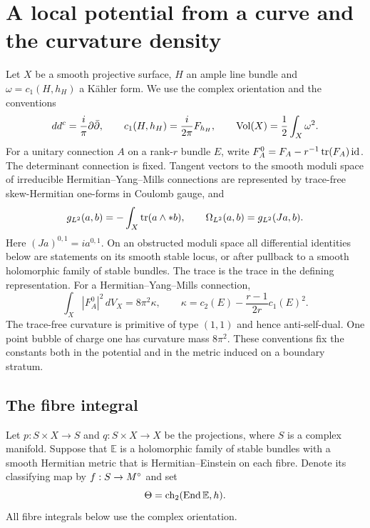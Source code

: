 \section{A local potential from a curve and the curvature density}\label{sec:potential}

Let $X$ be a smooth projective surface, $H$ an ample line bundle and
$\omega=c_1(H,h_H)$ a K\"ahler form. We use the complex orientation and the
conventions
\begin{equation}\label{eq:conventions}
 dd^c=\frac{i}{\pi}\partial\bar\partial,\qquad
 c_1(H,h_H)=\frac{i}{2\pi}F_{h_H},\qquad
 \operatorname{Vol}(X)=\frac12\int_X\omega^2.
\end{equation}
For a unitary connection $A$ on a rank-$r$ bundle $E$, write
$F_A^0=F_A-r^{-1}\operatorname{tr}(F_A)\,\mathrm{id}$.
The determinant connection is fixed. Tangent vectors to the smooth moduli
space of irreducible Hermitian--Yang--Mills connections are represented by
trace-free skew-Hermitian one-forms in Coulomb gauge, and
\begin{equation}\label{eq:l2metric}
 g_{L^2}(a,b)=-\int_X\operatorname{tr}(a\wedge *b),\qquad
 \Omega_{L^2}(a,b)=g_{L^2}(Ja,b).
\end{equation}
Here $(Ja)^{0,1}=ia^{0,1}$. On an obstructed moduli space all differential
identities below are statements on its smooth stable locus, or after
pullback to a smooth holomorphic family of stable bundles.
The trace is the trace in the defining representation. For a Hermitian--Yang--Mills connection,
\begin{equation}\label{eq:charge}
 \int_X|F_A^0|^2\,dV_X=8\pi^2\kappa,\qquad
 \kappa=c_2(E)-\frac{r-1}{2r}c_1(E)^2.
\end{equation}
The trace-free curvature is primitive of type $(1,1)$ and hence
anti-self-dual. One point bubble of charge one has curvature mass $8\pi^2$.
These conventions fix the constants both in the potential and in the
metric induced on a boundary stratum.

\subsection{The fibre integral}
Let $p:S\times X\to S$ and $q:S\times X\to X$ be the projections, where
$S$ is a complex manifold. Suppose that $\mathbb E$ is a holomorphic family
of stable bundles with a smooth Hermitian metric that is Hermitian--Einstein
on each fibre. Denote its classifying map by $f:S\to M^{\circ}$ and set
\[
 \Theta=\operatorname{ch}_2(\operatorname{End}\mathbb E,h).
\]
All fibre integrals below use the complex orientation.

